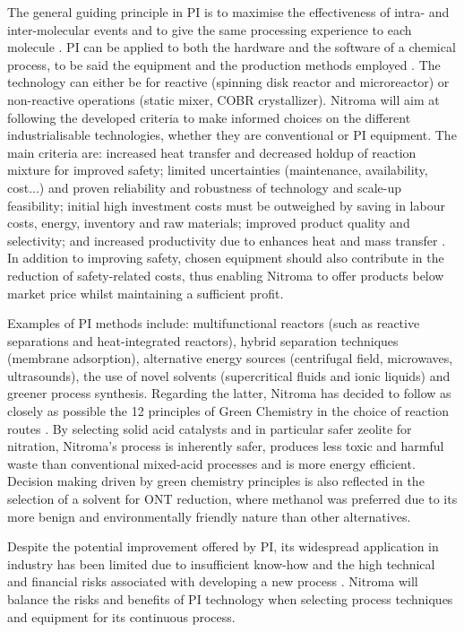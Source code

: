 The general guiding principle in PI is to maximise the effectiveness of intra- and inter-molecular events and to give the same processing experience to each molecule \cite{randall_process_2020}. PI can be applied to both the hardware and the software of a chemical process, to be said the equipment and the production methods employed \cite{stankiewicz_re-engineering_2003}. The technology can either be for reactive (spinning disk reactor and microreactor) or non-reactive operations (static mixer, COBR crystallizer). Nitroma will aim at following the developed criteria to make informed choices on the different industrialisable technologies, whether they are conventional or PI equipment. The main criteria are: increased heat transfer and decreased holdup of reaction mixture for improved safety; limited uncertainties (maintenance, availability, cost...) and proven reliability and robustness of technology and scale-up feasibility; initial high investment costs must be outweighed by saving in labour costs, energy, inventory and raw materials; improved product quality and selectivity; and increased productivity due to enhances heat and mass transfer \cite{randall_process_2020}. In addition to improving safety, chosen equipment should also contribute in the reduction of safety-related costs, thus enabling Nitroma to offer products below market price whilst maintaining a sufficient profit.

Examples of PI methods include: multifunctional reactors (such as reactive separations and heat-integrated reactors), hybrid separation techniques (membrane adsorption), alternative energy sources (centrifugal field, microwaves, ultrasounds), the use of novel solvents (supercritical fluids and ionic liquids) and greener process synthesis. Regarding the latter, Nitroma has decided to follow as closely as possible the 12 principles of Green Chemistry in the choice of reaction routes \cite{anastas_green_2010}. By selecting solid acid catalysts and in particular safer zeolite for nitration, Nitroma's process is inherently safer, produces less toxic and harmful waste than conventional mixed-acid processes and is more energy efficient. Decision making driven by green chemistry principles is also reflected in the selection of a solvent for ONT reduction, where methanol was preferred due to its more benign and environmentally friendly nature than other alternatives.

Despite the potential improvement offered by PI, its widespread application in industry has been limited due to insufficient know-how and the high technical and financial risks associated with developing a new process \cite{randall_process_2020}. Nitroma will balance the risks and benefits of PI technology when selecting process techniques and equipment for its continuous process.

